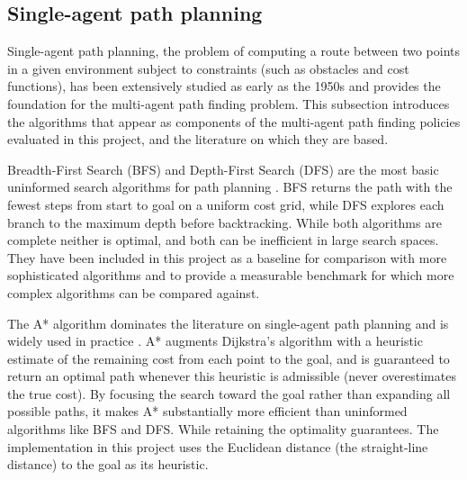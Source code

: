 \subsection{Single-agent path planning}
\label{sec:single-agent-planning}

Single-agent path planning, the problem of computing a route between two points in a given environment subject to constraints (such as obstacles and cost functions), has been extensively studied as early as the 1950s and provides the foundation for the multi-agent path finding problem. This subsection introduces the algorithms that appear as components of the multi-agent path finding policies evaluated in this project, and the literature on which they are based. \par

\vspace{1em}

Breadth-First Search (BFS) and Depth-First Search (DFS) are the most basic uninformed search algorithms for path planning \cite{cormen2022clrs}. BFS returns the path with the fewest steps from start to goal on a uniform cost grid, while DFS explores each branch to the maximum depth before backtracking. While both algorithms are complete neither is optimal, and both can be inefficient in large search spaces. They have been included in this project as a baseline for comparison with more sophisticated algorithms and to provide a measurable benchmark for which more complex algorithms can be compared against. \par

\vspace{1em}

The A* algorithm dominates the literature on single-agent path planning and is widely used in practice \cite{hart1968astar}. A* augments Dijkstra's algorithm with a heuristic estimate of the remaining cost from each point to the goal, and is guaranteed to return an optimal path whenever this heuristic is admissible (never overestimates the true cost). By focusing the search toward the goal rather than expanding all possible paths, it makes A* substantially more efficient than uninformed algorithms like BFS and DFS. While retaining the optimality guarantees. The implementation in this project uses the Euclidean distance (the straight-line distance) to the goal as its heuristic. \par

\vspace{1em}

